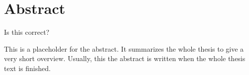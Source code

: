 \chapter*{Abstract}
\label{cha:abstract}

Is this correct?

\textcite{gatesRoadAhead1995}
This is a placeholder for the abstract. It summarizes the whole thesis
to give a very short overview. Usually, this the abstract is written
when the whole thesis text is finished.
